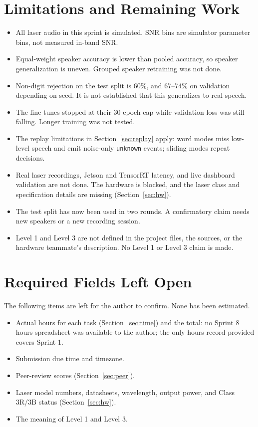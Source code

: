 \documentclass{article}
\begin{document}
\section{Limitations and Remaining Work}
\begin{itemize}[leftmargin=0.25in]
\item All laser audio in this sprint is simulated. SNR bins are simulator parameter bins, not measured in-band SNR.
\item Equal-weight speaker accuracy is lower than pooled accuracy, so speaker generalization is uneven. Grouped speaker retraining was not done.
\item Non-digit rejection on the test split is 60\%, and 67--74\% on validation depending on seed. It is not established that this generalizes to real speech.
\item The fine-tunes stopped at their 30-epoch cap while validation loss was still falling. Longer training was not tested.
\item The replay limitations in Section~\ref{sec:replay} apply: word modes miss low-level speech and emit noise-only \texttt{unknown} events; sliding modes repeat decisions.
\item Real laser recordings, Jetson and TensorRT latency, and live dashboard validation are not done. The hardware is blocked, and the laser class and specification details are missing (Section~\ref{sec:hw}).
\item The test split has now been used in two rounds. A confirmatory claim needs new speakers or a new recording session.
\item Level 1 and Level 3 are not defined in the project files, the sources, or the hardware teammate's description. No Level 1 or Level 3 claim is made.
\end{itemize}

\section{Required Fields Left Open}
The following items are left for the author to confirm. None has been estimated.
\begin{itemize}[leftmargin=0.25in]
\item Actual hours for each task (Section~\ref{sec:time}) and the total: no Sprint 8 hours spreadsheet was available to the author; the only hours record provided covers Sprint 1.
\item Submission due time and timezone.
\item Peer-review scores (Section~\ref{sec:peer}).
\item Laser model numbers, datasheets, wavelength, output power, and Class 3R/3B status (Section~\ref{sec:hw}).
\item The meaning of Level 1 and Level 3.
\end{itemize}
\end{document}

